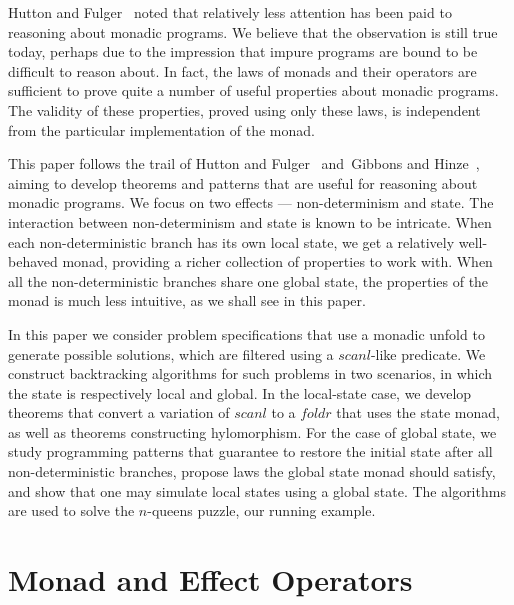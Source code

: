 \documentclass{llncs}
\newcommand{\Varid}[1]{\mathit{#1}}
\let\Varid\mathit
\begin{document}

Hutton and Fulger~\cite{HuttonFulger:08:Reasoning} noted that relatively less attention has been paid to reasoning about monadic programs.
We believe that the observation is still true today, perhaps due to the impression that impure programs are bound to be difficult to reason about.
In fact, the laws of monads and their operators are sufficient to prove quite a number of useful properties about monadic programs.
The validity of these properties, proved using only these laws, is independent from the particular implementation of the monad.

This paper follows the trail of Hutton and Fulger~\cite{HuttonFulger:08:Reasoning} and~Gibbons and Hinze~\cite{GibbonsHinze:11:Just}, aiming to develop theorems and patterns that are useful for reasoning about monadic programs.
We focus on two effects --- non-determinism and state.
The interaction between non-determinism and state is known to be intricate.
When each non-deterministic branch has its own local state, we get a relatively well-behaved monad, providing a richer collection of properties to work with.
When all the non-deterministic branches share one global state, the properties of the monad is much less intuitive, as we shall see in this paper.

In this paper we consider problem specifications that use a monadic unfold to generate possible solutions, which are filtered using a \ensuremath{\Varid{scanl}}-like predicate.
We construct backtracking algorithms for such problems in two scenarios, in which the state is respectively local and global.
In the local-state case, we develop theorems that convert a variation of \ensuremath{\Varid{scanl}} to a \ensuremath{\Varid{foldr}} that uses the state monad, as well as theorems constructing hylomorphism.
For the case of global state, we study programming patterns that guarantee to restore the initial state after all non-deterministic branches, propose laws the global state monad should satisfy, and show that one may simulate local states using a global state.
The algorithms are used to solve the \ensuremath{\Varid{n}}-queens puzzle, our running example.
\section{Monad and Effect Operators}
\end{document}
